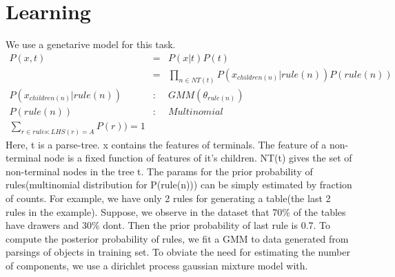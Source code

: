 \documentclass[11pt]{article} %
\begin{document}
\section{Learning}
We use a genetarive model for this task.
\begin{eqnarray}
P(x,t)&=&P(x|t)P(t) \\
&=& \prod_{n \in NT(t)}{P(x_{children(n)} |rule(n) )P(rule(n))}\\
P(x_{children(n)} |rule(n) ) &:& GMM(\theta _{rule(n)})\\
P(rule(n)) &:& Multinomial \\
\sum_{r \in rules:LHS(r)=A}{P(r))}=1
\end{eqnarray}
Here, t is a parse-tree. x contains the features of terminals. The feature of a non-terminal node is a fixed function of features of it's children. NT(t) gives the set of non-terminal nodes in the tree t.
The params for the prior probability of rules(multinomial distribution for P(rule(n))) can be simply estimated by fraction of counts. For example, we have only 2 rules for generating a table(the last 2 rules in the example). Suppose, we observe in the dataset that 70\% of the tables have drawers and 30\% dont. Then the prior probability of last rule is 0.7.
To compute the posterior probability of rules, we fit a GMM to data generated from parsings of objects in training set. To obviate the need for estimating the number of components, we use a dirichlet process gaussian mixture model with. 
\end{document}
